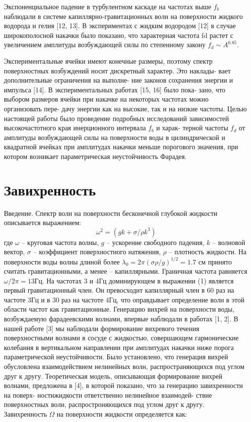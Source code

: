 Экспоненциальное падение в турбулентном каскаде на частотах выше $f_b$ наблюдали в системе капиллярно-гравитационных волн на поверхности жидкого водорода и гелия [12, 13]. В экспериментах с жидким водородом [12] в случае широкополосной накачки было показано, что характерная частота fd растет с увеличением амплитуды возбуждающей силы по степенному закону $f_d \sim A^{0.85}$.

Экспериментальные ячейки имеют конечные размеры, поэтому спектр поверхностных возбуждений носит дискретный характер. Это наклады- вает дополнительные ограничения на выполне- ние законов сохранения энергии и импульса [14]. В экспериментальных работах [15, 16] было пока- зано, что выбором размеров ячейки при накачке на некоторых частотах можно организовать пере- дачу энергии как на высокие, так и на низкие частоты.
Целью настоящей работы было проведение подробных исследований зависимостей высокочастотного края инерционного интервала $f_b$ и харак- терной частоты $f_d$ от амплитуды возбуждающей силы на поверхности воды в цилиндрической и квадратной ячейках при амплитудах накачки меньше порогового значения, при котором возникает параметрическая неустойчивость Фарадея.

\section{Завихренность}%
Введение. Спектр волн на поверхности бесконечной глубокой жидкости описывается выражением:
\begin{equation}
 \label{eq:disper}
\omega^2 = (gk + \sigma/\rho k^3)
\end{equation}
где $\omega$ – круговая частота волны, $g$ – ускорение свободного падения, $k$ – волновой вектор, $\sigma$ – коэффициент поверхностного натяжения, $\rho$ – плотность жидкости. На поверхности воды волны длиной более $\lambda_0 = 2 \pi (\sigma \rho/g)^{1/2} = 1.7$ см принято считать гравитационными, а менее – капиллярными. Граничная частота равняется $\omega/2\pi = 13Гц$. На частотах 3 и 4Гц доминирующем в выражении (1) является первый гравитационный член. Он превосходит капиллярный член в 60 раз на частоте 3Гц и в 30 раз на частоте 4Гц, что оправдывает определение волн в этой области частот как гравитационные. Генерацию вихрей на поверхности воды, возбуждаемую фарадеевскими волнами, впервые наблюдали в работах [1, 2]. В нашей работе [3] мы наблюдали формирование вихревого течения поверхностными волнами в сосуде с жидкостью, совершающем гармонические колебания в вертикальном направлении при амплитудах накачки ниже порога параметрической неустойчивости. Было установлено, что генерация вихрей обусловлена взаимодействием нелинейных волн, распространяющихся под углом друг к другу. Теоретическая модель, описывающая формирование вихрей волнами, предложена в [4], в которой показано, что за генерацию завихренности на поверх- ностижидкости ответственно нелинейное взаимодей- ствие поверхностных волн, распростроняющихся под углом друг к другу. Завихренность $\Omega$ на поверхности жидкости определяется как:


